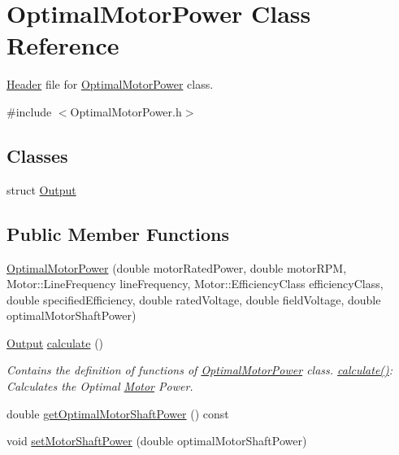 \hypertarget{class_optimal_motor_power}{}\section{Optimal\+Motor\+Power Class Reference}
\label{class_optimal_motor_power}


\hyperlink{class_header}{Header} file for \hyperlink{class_optimal_motor_power}{Optimal\+Motor\+Power} class.  




{\ttfamily \#include $<$Optimal\+Motor\+Power.\+h$>$}

\subsection*{Classes}
\begin{DoxyCompactItemize}
\item 
struct \hyperlink{struct_optimal_motor_power_1_1_output}{Output}
\end{DoxyCompactItemize}
\subsection*{Public Member Functions}
\begin{DoxyCompactItemize}
\item 
\hyperlink{class_optimal_motor_power_a36017bbd359437ce77c1e18dc2377961}{Optimal\+Motor\+Power} (double motor\+Rated\+Power, double motor\+R\+PM, Motor\+::\+Line\+Frequency line\+Frequency, Motor\+::\+Efficiency\+Class efficiency\+Class, double specified\+Efficiency, double rated\+Voltage, double field\+Voltage, double optimal\+Motor\+Shaft\+Power)
\item 
\hyperlink{struct_optimal_motor_power_1_1_output}{Output} \hyperlink{class_optimal_motor_power_aa9f5364de1af6fd5c038b98e8509b1fb}{calculate} ()
\begin{DoxyCompactList}\small\item\em Contains the definition of functions of \hyperlink{class_optimal_motor_power}{Optimal\+Motor\+Power} class. \hyperlink{class_optimal_motor_power_aa9f5364de1af6fd5c038b98e8509b1fb}{calculate()}\+: Calculates the Optimal \hyperlink{struct_motor}{Motor} Power. \end{DoxyCompactList}\item 
double \hyperlink{class_optimal_motor_power_a7d6e976abf406c54637d3b51e098d7c8}{get\+Optimal\+Motor\+Shaft\+Power} () const
\item 
void \hyperlink{class_optimal_motor_power_ada8a9e3caac34c54470ad13ffe7edf53}{set\+Motor\+Shaft\+Power} (double optimal\+Motor\+Shaft\+Power)
\end{DoxyCompactItemize}


